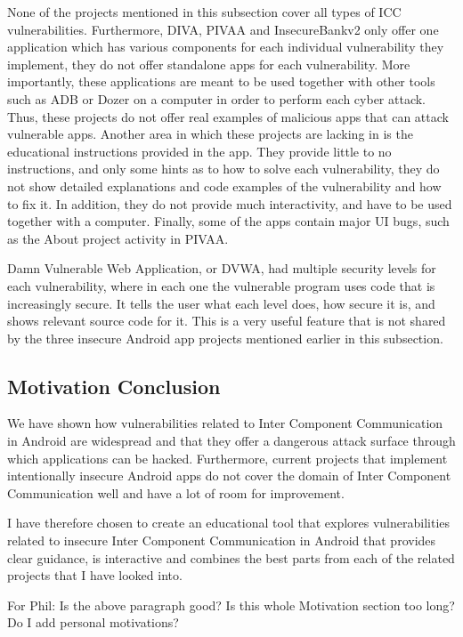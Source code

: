 		None of the projects mentioned in this subsection cover all types of ICC vulnerabilities. Furthermore, DIVA, PIVAA and InsecureBankv2 only offer one application which has various components for each individual vulnerability they implement, they do not offer standalone apps for each vulnerability. More importantly, these applications are meant to be used together with other tools such as ADB or Dozer on a computer in order to perform each cyber attack. Thus, these projects do not offer real examples of malicious apps that can attack vulnerable apps. Another area in which these projects are lacking in is the educational instructions provided in the app. They provide little to no instructions, and only some hints as to how to solve each vulnerability, they do not show detailed explanations and code examples of the vulnerability and how to fix it. In addition, they do not provide much interactivity, and have to be used together with a computer. Finally, some of the apps contain major UI bugs, such as the About project activity in PIVAA.
		
		Damn Vulnerable Web Application, or DVWA, had multiple security levels for each vulnerability, where in each one the vulnerable program uses code that is increasingly secure. It tells the user what each level does, how secure it is, and shows relevant source code for it. This is a very useful feature that is not shared by the three insecure Android app projects mentioned earlier in this subsection.
		
		\subsection{Motivation Conclusion}
		
		We have shown how vulnerabilities related to Inter Component Communication in Android are widespread and that they offer a dangerous attack surface through which applications can be hacked. Furthermore, current projects that implement intentionally insecure Android apps do not cover the domain of Inter Component Communication well and have a lot of room for improvement. 
		
		I have therefore chosen to create an educational tool that explores vulnerabilities related to insecure Inter Component Communication in Android that provides clear guidance, is interactive and combines the best parts from each of the related projects that I have looked into.
		
		For Phil: Is the above paragraph good? Is this whole Motivation section too long? Do I add personal motivations?
		
